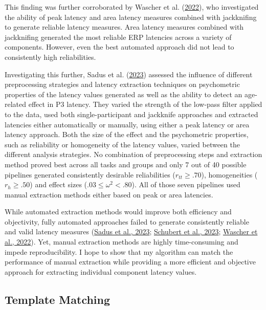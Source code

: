 \documentclass[
  man]{apa7}
\begin{document}
This finding was further corroborated by Wascher et al. (\protect\hyperlink{ref-wascher2022mental}{2022}), who investigated the ability of peak latency and area latency measures combined with jackknifing to generate reliable latency measures. Area latency measures combined with jackknifing generated the most reliable ERP latencies across a variety of components. However, even the best automated approach did not lead to consistently high reliabilities.

Investigating this further, Sadus et al. (\protect\hyperlink{ref-sadus2023multiverse}{2023}) assessed the influence of different preprocessing strategies and latency extraction techniques on psychometric properties of the latency values generated as well as the ability to detect an age-related effect in P3 latency. They varied the strength of the low-pass filter applied to the data, used both single-participant and jackknife approaches and extracted latencies either automatically or manually, using either a peak latency or area latency approach. Both the size of the effect and the psychometric properties, such as reliability or homogeneity of the latency values, varied between the different analysis strategies. No combination of preprocessing steps and extraction method proved best across all tasks and groups and only 7 out of 40 possible pipelines generated consistently desirable reliabilities (\(r_{tt} \ge .70\)), homogeneities (\(r_{h} \ge .50\)) and effect sizes (\(.03 \le \omega^2 <.80\)). All of those seven pipelines used manual extraction methods either based on peak or area latencies.

While automated extraction methods would improve both efficiency and objectivity, fully automated approaches failed to generate consistently reliable and valid latency measures (\protect\hyperlink{ref-sadus2023multiverse}{Sadus et al., 2023}; \protect\hyperlink{ref-schubert2023robust}{Schubert et al., 2023}; \protect\hyperlink{ref-wascher2022mental}{Wascher et al., 2022}). Yet, manual extraction methods are highly time-consuming and impede reproducibility. I hope to show that my algorithm can match the performance of manual extraction while providing a more efficient and objective approach for extracting individual component latency values.

\hypertarget{template-matching}{%
\subsection{Template Matching}\label{template-matching}}
\end{document}
